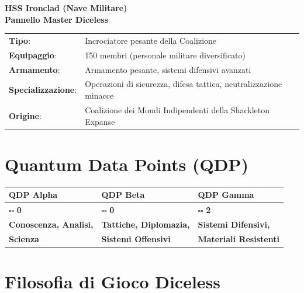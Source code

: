 \documentclass[11pt,a4paper]{article}
\begin{document}
\begin{center}
\Huge\textbf{\textcolor{militaryred}{HSS Ironclad (Nave Militare)}}\\[0.5cm]
\Large\textbf{Pannello Master Diceless}
\end{center}

\begin{tcolorbox}[colback=militarylightgray!20, colframe=militaryred, title=\textbf{Informazioni sulla Nave}]
\begin{tabular}{ll}
\textbf{Tipo}: & Incrociatore pesante della Coalizione \\
\textbf{Equipaggio}: & 150 membri (personale militare diversificato) \\
\textbf{Armamento}: & Armamento pesante, sistemi difensivi avanzati \\
\textbf{Specializzazione}: & Operazioni di sicurezza, difesa tattica, neutralizzazione minacce \\
\textbf{Origine}: & Coalizione dei Mondi Indipendenti della Shackleton Expanse \\
\end{tabular}
\end{tcolorbox}

\section{Quantum Data Points (QDP)}

\begin{tcolorbox}[colback=militarylightgray!10, colframe=militaryred]
\begin{tabularx}{\textwidth}{|X|X|X|}
\hline
\rowcolor{militaryred!20} \textbf{QDP Alpha} & \textbf{QDP Beta} & \textbf{QDP Gamma} \\
\hline
\large $\square\square$ \textbf{0} & \large $\square\square$ \textbf{0} & \large $\square\square$ \textbf{2} \\
\hline
\textbf{Conoscenza, Analisi,} & \textbf{Tattiche, Diplomazia,} & \textbf{Sistemi Difensivi,} \\
\textbf{Scienza} & \textbf{Sistemi Offensivi} & \textbf{Materiali Resistenti} \\
\hline
\end{tabularx}
\end{tcolorbox}

\section{Filosofia di Gioco Diceless}
\end{document}
